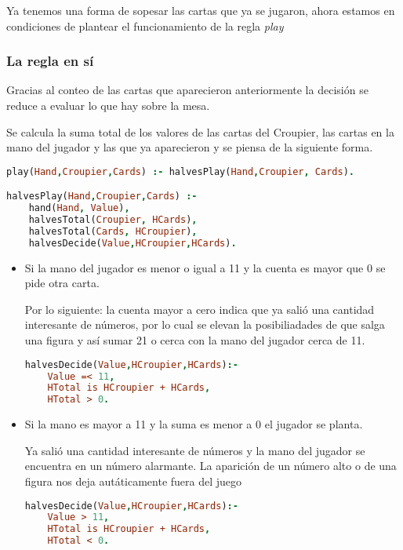 \documentclass[12pt]{report}
\begin{document}
Ya tenemos una forma de sopesar las cartas que ya se jugaron, ahora estamos en condiciones de plantear el funcionamiento de la regla \textit{play}

\subsubsection*{La regla en sí}

Gracias al conteo de las cartas que aparecieron anteriormente la decisión se reduce a evaluar lo que hay sobre la mesa.

Se calcula la suma total de los valores de las cartas del Croupier, las cartas en la mano del jugador y las que ya aparecieron y se piensa de la siguiente forma.


\begin{lstlisting}[language=Prolog]
play(Hand,Croupier,Cards) :- halvesPlay(Hand,Croupier, Cards).

halvesPlay(Hand,Croupier,Cards) :- 
    hand(Hand, Value), 
    halvesTotal(Croupier, HCards),
    halvesTotal(Cards, HCroupier),
    halvesDecide(Value,HCroupier,HCards).
\end{lstlisting}

\begin{itemize}
    \item Si la mano del jugador es menor o igual a 11 y la cuenta es mayor que 0 se pide otra carta. 

        Por lo siguiente: la cuenta mayor a cero indica que ya salió una cantidad interesante de números, por lo cual se elevan la posibiliadades de que salga una figura y así sumar 21 o cerca con la mano del jugador cerca de 11.

\begin{lstlisting}[language=Prolog]
halvesDecide(Value,HCroupier,HCards):-
    Value =< 11,
    HTotal is HCroupier + HCards,
    HTotal > 0.
\end{lstlisting}
    
    \item Si la mano es mayor a 11 y la suma es menor a 0 el jugador se planta.

        Ya salió una cantidad interesante de números y la mano del jugador se encuentra en un número alarmante. La aparición de un número alto o de una figura nos deja autáticamente fuera del juego


\begin{lstlisting}[language=Prolog]
halvesDecide(Value,HCroupier,HCards):-
    Value > 11,
    HTotal is HCroupier + HCards,
    HTotal < 0.
\end{lstlisting}

\end{itemize}
\end{document}
